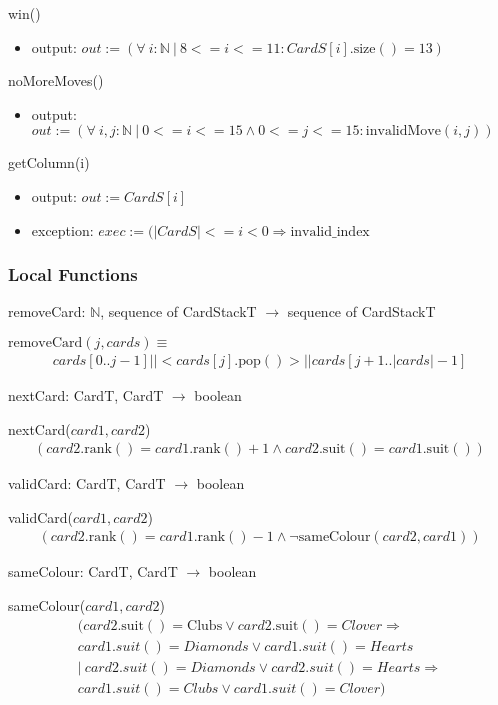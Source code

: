 \documentclass[12pt,fleqn]{article}
\begin{document}
\noindent win()
\begin{itemize}
\item output: $out := (\forall\ i: \mathbb{N}\ |\ 8 <= i <= 11 : CardS[i].\mbox{size}() = 13)$
\end{itemize}

\noindent noMoreMoves()
\begin{itemize}
\item output: $out := (\forall\ i, j: \mathbb{N}\ |\ 0 <= i <= 15 \land 0 <= j <= 15 : \mbox{invalidMove}(i, j))$
\end{itemize}

\noindent getColumn(i)
\begin{itemize}
\item output: $out := CardS[i]$
\item exception: $exec := (|CardS| <= i < 0  \Rightarrow \mbox{invalid\_index}$
\end{itemize}

\subsubsection*{Local Functions}
\noindent removeCard: $\mathbb{N}$, sequence of CardStackT $\rightarrow$ sequence of CardStackT

\noindent $\mbox{removeCard}(j, cards) \equiv $
\begin{gather*}
cards[0..j-1] || <cards[j].\mbox{pop}()> || cards[j+1..|cards|-1]
\end{gather*}


\noindent nextCard: CardT, CardT $\rightarrow$ boolean

\noindent nextCard($\mathit{card1, card2}$)
\begin{gather*}
(card2.\mbox{rank}() = card1.\mbox{rank}() + 1 \land card2.\mbox{suit}() = card1.\mbox{suit}())
\end{gather*}


\noindent validCard: CardT, CardT $\rightarrow$ boolean

\noindent validCard($\mathit{card1, card2}$)
\begin{gather*}
(card2.\mbox{rank}() = card1.\mbox{rank}() - 1 \land \lnot \mbox{sameColour}(card2, card1))
\end{gather*}


\noindent sameColour: CardT, CardT $\rightarrow$ boolean

\noindent sameColour($\mathit{card1, card2}$)
\begin{gather*}
(card2.\mbox{suit}() = \mbox{Clubs} \lor card2.\mbox{suit}() = Clover \Rightarrow \\ card1.suit() = Diamonds \lor card1.suit() = Hearts \\ | \ card2.suit() = Diamonds \lor card2.suit() = Hearts \Rightarrow \\ card1.suit() = Clubs \lor card1.suit() = Clover)
\end{gather*}
\end{document}
